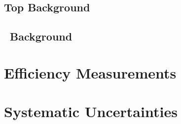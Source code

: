 \documentclass{cmspaper}
\begin{document}
\subsection{Top Background}
     \label{sec:bkg_top}
     
\subsection{\dytt\ Background}
     \label{sec:bkg_dytt}
     

\section{Efficiency Measurements}

\section{Systematic Uncertainties}
\end{document}
